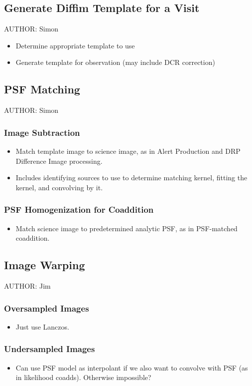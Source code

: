 \subsection{Generate Diffim Template for a Visit}
AUTHOR: Simon
\begin{itemize}
\item Determine appropriate template to use
\item Generate template for observation (may include DCR correction)
\end{itemize}

\subsection{PSF Matching}
AUTHOR: Simon
\subsubsection{Image Subtraction}
\begin{itemize}
\item Match template image to science image, as in Alert Production and DRP Difference Image processing.
\item Includes identifying sources to use to determine matching kernel, fitting the kernel, and convolving by it.
\end{itemize}
\subsubsection{PSF Homogenization for Coaddition}
\begin{itemize}
\item Match science image to predetermined analytic PSF, as in PSF-matched coaddition.
\end{itemize}

\subsection{Image Warping}
AUTHOR: Jim
\subsubsection{Oversampled Images}
\begin{itemize}
\item Just use Lanczos.
\end{itemize}
\subsubsection{Undersampled Images}
\begin{itemize}
\item Can use PSF model as interpolant if we also want to convolve with PSF (as in likelihood coadds).  Otherwise impossible?
\end{itemize}
